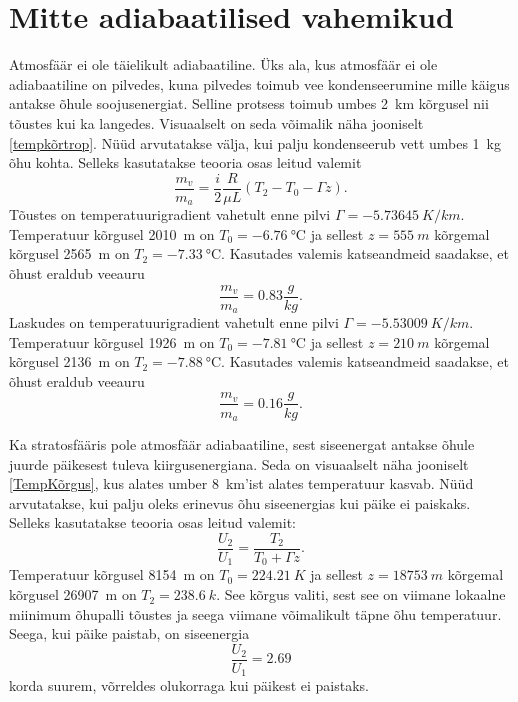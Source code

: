 \documentclass{trkut}%
\begin{document}
\section{Mitte adiabaatilised vahemikud}
Atmosfäär ei ole täielikult adiabaatiline. Üks ala, kus atmosfäär ei ole adiabaatiline on pilvedes, kuna pilvedes toimub vee kondenseerumine mille käigus antakse õhule soojusenergiat. Selline protsess toimub umbes \SI{2}{km} kõrgusel nii tõustes kui ka langedes. Visuaalselt on seda võimalik näha jooniselt \ref{tempkõrtrop}. Nüüd arvutatakse välja, kui palju kondenseerub vett umbes \SI{1}{kg} õhu kohta. Selleks kasutatakse teooria osas leitud valemit
\begin{equation*}
\frac{m_v}{m_a} = \frac{i}{2}\frac{R}{\mu L}\left(T_2- T_0 - \Gamma z\right).
\end{equation*}
Tõustes on temperatuurigradient vahetult enne pilvi $\Gamma = \SI{-5.73645}{K/km}$. Temperatuur kõrgusel \SI{2010}{m} on $T_0 = \SI{-6.76}{\degreeCelsius}$ ja sellest $z = \SI{555}{m}$ kõrgemal kõrgusel \SI{2565}{m} on $T_2 = \SI{-7.33}{\degreeCelsius}$. Kasutades valemis katseandmeid saadakse, et õhust eraldub veeauru
\begin{equation*}
\frac{m_v}{m_a} = 0.83 \frac{g}{kg}.
\end{equation*}
Laskudes on temperatuurigradient vahetult enne pilvi $\Gamma = \SI{-5.53009}{K/km}$. Temperatuur kõrgusel \SI{1926}{m} on $T_0 = \SI{-7.81}{\degreeCelsius}$ ja sellest $z = \SI{210}{m}$ kõrgemal kõrgusel \SI{2136}{m} on $T_2 = \SI{-7.88}{\degreeCelsius}$. Kasutades valemis katseandmeid saadakse, et õhust eraldub veeauru
\begin{equation*}
\frac{m_v}{m_a} = 0.16 \frac{g}{kg}.
\end{equation*}

Ka stratosfääris pole atmosfäär adiabaatiline, sest siseenergat antakse õhule juurde päikesest tuleva kiirgusenergiana. Seda on visuaalselt näha jooniselt \ref{TempKõrgus}, kus alates umber \SI{8}{km}'ist alates temperatuur kasvab. Nüüd arvutatakse, kui palju oleks erinevus õhu siseenergias kui päike ei paiskaks. Selleks kasutatakse teooria osas leitud valemit:
\begin{equation*}
\frac{U_2}{U_1} = \frac{T_2}{T_0+\Gamma z}.
\end{equation*}
Temperatuur kõrgusel \SI{8154}{m} on $T_0 = \SI{224.21}{K}$ ja sellest $z = \SI{18753}{m}$ kõrgemal kõrgusel \SI{26907}{m} on $T_2 = \SI{238.6}{k}$. See kõrgus valiti, sest see on viimane lokaalne miinimum õhupalli tõustes ja seega viimane võimalikult täpne õhu temperatuur. Seega, kui päike paistab, on siseenergia 
\begin{equation*}
\frac{U_2}{U_1} = 2.69
\end{equation*}
korda suurem, võrreldes olukorraga kui päikest ei paistaks.
\end{document}
